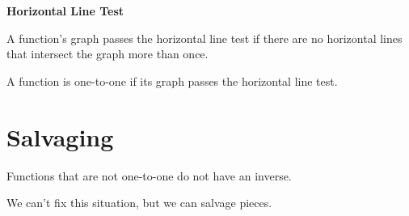 \documentclass{ximera}
\begin{document}
\begin{example}
\begin{image}
\end{image}






\end{example}




\begin{definition} \textbf{\textcolor{green!50!black}{Horizontal Line Test}}  


A function's graph passes the horizontal line test if there are no horizontal lines that intersect the graph more than once.


A function is one-to-one if its graph passes the horizontal line test.

\end{definition}
















\section{Salvaging}


Functions that are not one-to-one do not have an inverse.

We can't fix this situation, but we can salvage pieces. \\
\end{document}
